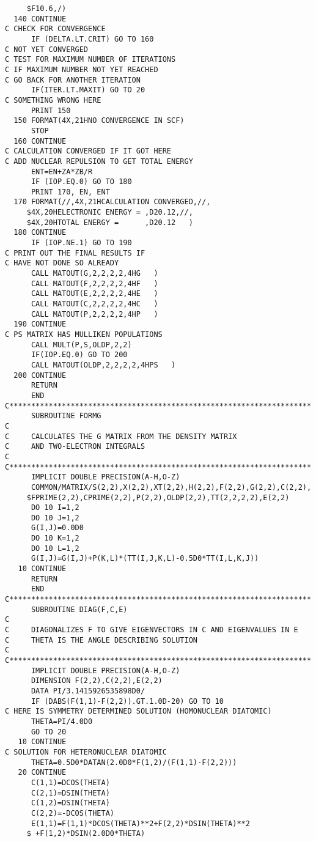 \begin{verbatim}
     $F10.6,/)
  140 CONTINUE
C CHECK FOR CONVERGENCE
      IF (DELTA.LT.CRIT) GO TO 160
C NOT YET CONVERGED
C TEST FOR MAXIMUM NUMBER OF ITERATIONS
C IF MAXIMUM NUMBER NOT YET REACHED
C GO BACK FOR ANOTHER ITERATION
      IF(ITER.LT.MAXIT) GO TO 20
C SOMETHING WRONG HERE
      PRINT 150
  150 FORMAT(4X,21HNO CONVERGENCE IN SCF)
      STOP
  160 CONTINUE
C CALCULATION CONVERGED IF IT GOT HERE
C ADD NUCLEAR REPULSION TO GET TOTAL ENERGY
      ENT=EN+ZA*ZB/R
      IF (IOP.EQ.0) GO TO 180
      PRINT 170, EN, ENT
  170 FORMAT(//,4X,21HCALCULATION CONVERGED,//,
     $4X,20HELECTRONIC ENERGY = ,D20.12,//,
     $4X,20HTOTAL ENERGY =      ,D20.12   )
  180 CONTINUE
      IF (IOP.NE.1) GO TO 190
C PRINT OUT THE FINAL RESULTS IF
C HAVE NOT DONE SO ALREADY
      CALL MATOUT(G,2,2,2,2,4HG   )
      CALL MATOUT(F,2,2,2,2,4HF   )
      CALL MATOUT(E,2,2,2,2,4HE   )
      CALL MATOUT(C,2,2,2,2,4HC   )
      CALL MATOUT(P,2,2,2,2,4HP   )
  190 CONTINUE
C PS MATRIX HAS MULLIKEN POPULATIONS
      CALL MULT(P,S,OLDP,2,2)
      IF(IOP.EQ.0) GO TO 200
      CALL MATOUT(OLDP,2,2,2,2,4HPS   )
  200 CONTINUE
      RETURN
      END
C*********************************************************************
      SUBROUTINE FORMG
C
C     CALCULATES THE G MATRIX FROM THE DENSITY MATRIX
C     AND TWO-ELECTRON INTEGRALS
C
C*********************************************************************
      IMPLICIT DOUBLE PRECISION(A-H,O-Z)
      COMMON/MATRIX/S(2,2),X(2,2),XT(2,2),H(2,2),F(2,2),G(2,2),C(2,2),
     $FPRIME(2,2),CPRIME(2,2),P(2,2),OLDP(2,2),TT(2,2,2,2),E(2,2)
      DO 10 I=1,2
      DO 10 J=1,2
      G(I,J)=0.0D0
      DO 10 K=1,2
      DO 10 L=1,2
      G(I,J)=G(I,J)+P(K,L)*(TT(I,J,K,L)-0.5D0*TT(I,L,K,J))
   10 CONTINUE
      RETURN
      END
C*********************************************************************
      SUBROUTINE DIAG(F,C,E)
C
C     DIAGONALIZES F TO GIVE EIGENVECTORS IN C AND EIGENVALUES IN E
C     THETA IS THE ANGLE DESCRIBING SOLUTION
C
C*********************************************************************
      IMPLICIT DOUBLE PRECISION(A-H,O-Z)
      DIMENSION F(2,2),C(2,2),E(2,2)
      DATA PI/3.1415926535898D0/
      IF (DABS(F(1,1)-F(2,2)).GT.1.0D-20) GO TO 10
C HERE IS SYMMETRY DETERMINED SOLUTION (HOMONUCLEAR DIATOMIC)
      THETA=PI/4.0D0
      GO TO 20
   10 CONTINUE
C SOLUTION FOR HETERONUCLEAR DIATOMIC
      THETA=0.5D0*DATAN(2.0D0*F(1,2)/(F(1,1)-F(2,2)))
   20 CONTINUE
      C(1,1)=DCOS(THETA)
      C(2,1)=DSIN(THETA)
      C(1,2)=DSIN(THETA)
      C(2,2)=-DCOS(THETA)
      E(1,1)=F(1,1)*DCOS(THETA)**2+F(2,2)*DSIN(THETA)**2
     $ +F(1,2)*DSIN(2.0D0*THETA)

\end{verbatim}
